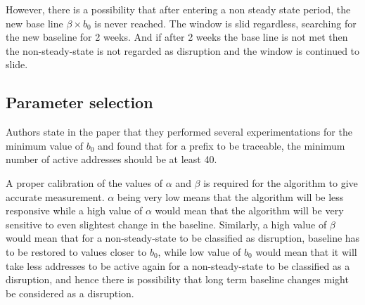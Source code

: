 \documentclass[11pt,twoside,a4paper]{article}
\begin{document}
However, there is a possibility that after entering a non steady state period, the new base line $\beta \times b_0$ is never reached. The window is slid regardless, searching for the new baseline for 2 weeks. And if after 2 weeks the base line is not met then the non-steady-state is not regarded as disruption and the window is continued to slide.

\subsection{Parameter selection}
Authors state in the paper that they performed several experimentations for the minimum value of $b_0$ and found that for a prefix to be traceable, the minimum number of active addresses should be at least 40.

A proper calibration of the values of $\alpha$ and $\beta$ is required for the algorithm to give accurate measurement. $\alpha$ being very low means that the algorithm will be less responsive while a high value of $\alpha$ would mean that the algorithm will be very sensitive to even slightest change in the baseline. Similarly, a high value of $\beta$ would mean that for a non-steady-state to be classified as disruption, baseline has to be restored to values closer to $b_0$, while low value of $b_0$ would mean that it will take less addresses to be active again for a non-steady-state to be classified as a disruption, and hence there is possibility that long term baseline changes might be considered as a disruption.
\end{document}
